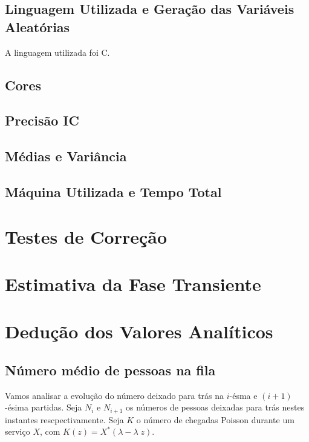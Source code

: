 \documentclass[a4paper]{article}
\begin{document}
\subsection{Linguagem Utilizada e Geração das Variáveis Aleatórias}
A linguagem utilizada foi C.
\subsection{Cores}
\subsection{Precisão IC}
\subsection{Médias e Variância}
\subsection{Máquina Utilizada e Tempo Total}

\section{Testes de Correção}
\section{Estimativa da Fase Transiente}

\newpage
\section{Dedução dos Valores Analíticos}
\subsection{Número médio de pessoas na fila}
Vamos analisar a evolução do número
deixado para trás na \(i\)-ésma e \((i+1)\)-ésima partidas.
Seja \(N_i\) e  \(N_{i+1}\) os números de pessoas
deixadas para trás nestes instantes rescpectivamente.
Seja \(K\) o número de chegadas Poisson
durante um serviço \(X\),
com \(K(z) = X^*(\lambda - \lambda \; z)\).
\end{document}

